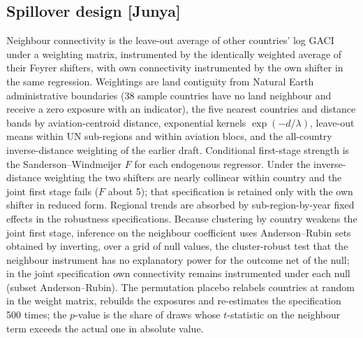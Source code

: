 \documentclass[12pt]{article}
\begin{document}
\subsection*{Spillover design [Junya]}
Neighbour connectivity is the leave-out average of other countries' log
GACI under a weighting matrix, instrumented by the identically weighted
average of their Feyrer shifters, with own connectivity instrumented by the
own shifter in the same regression. Weightings are land contiguity from
Natural Earth administrative boundaries (38 sample countries have no land
neighbour and receive a zero exposure with an indicator), the five nearest
countries and distance bands by aviation-centroid distance, exponential
kernels $\exp(-d/\lambda)$, leave-out means within UN sub-regions and
within aviation blocs, and the all-country inverse-distance weighting of
the earlier draft. Conditional first-stage strength is the
Sanderson--Windmeijer $F$ for each endogenous regressor. Under the
inverse-distance weighting the two shifters are nearly collinear within
country and the joint first stage fails ($F$ about 5); that specification
is retained only with the own shifter in reduced form. Regional trends are
absorbed by sub-region-by-year fixed effects in the robustness
specifications. Because clustering by country weakens the joint first
stage, inference on the neighbour coefficient uses Anderson--Rubin sets
obtained by inverting, over a grid of null values, the cluster-robust test
that the neighbour instrument has no explanatory power for the outcome net
of the null; in the joint specification own connectivity remains
instrumented under each null (subset Anderson--Rubin). The permutation placebo relabels countries at random in
the weight matrix, rebuilds the exposures and re-estimates the
specification 500 times; the $p$-value is the share of draws whose
$t$-statistic on the neighbour term exceeds the actual one in absolute
value.
\end{document}

